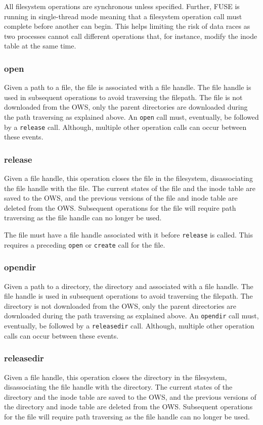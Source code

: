 All filesystem operations are synchronous unless specified. Further, FUSE is running in single-thread mode meaning that a filesystem operation call must complete before another can begin. This helps limiting the risk of data races as two processes cannot call different operations that, for instance, modify the inode table at the same time.

\subsubsection{open}
Given a path to a file, the file is associated with a file handle. The file handle is used in subsequent operations to avoid traversing the filepath. The file is not downloaded from the OWS, only the parent directories are downloaded during the path traversing as explained above. An \texttt{open} call must, eventually, be followed by a \texttt{release} call. Although, multiple other operation calls can occur between these events.

\subsubsection{release}
Given a file handle, this operation closes the file in the filesystem, disassociating the file handle with the file. The current states of the file and the inode table are saved to the OWS, and the previous versions of the file and inode table are deleted from the OWS. Subsequent operations for the file will require path traversing as the file handle can no longer be used.

The file must have a file handle associated with it before \texttt{release} is called. This requires a preceding \texttt{open} or \texttt{create} call for the file.

\subsubsection{opendir}
Given a path to a directory, the directory and associated with a file handle. The file handle is used in subsequent operations to avoid traversing the filepath. The directory is not downloaded from the OWS, only the parent directories are downloaded during the path traversing as explained above. An \texttt{opendir} call must, eventually, be followed by a \texttt{releasedir} call. Although, multiple other operation calls can occur between these events.

\subsubsection{releasedir}
Given a file handle, this operation closes the directory in the filesystem, disassociating the file handle with the directory. The current states of the directory and the inode table are saved to the OWS, and the previous versions of the directory and inode table are deleted from the OWS. Subsequent operations for the file will require path traversing as the file handle can no longer be used.

